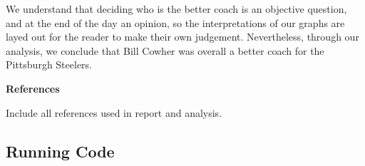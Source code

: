 \documentclass[
  letterpaper,
  DIV=11,
  numbers=noendperiod]{scrartcl}
\begin{document}
We understand that deciding who is the better coach is an objective
question, and at the end of the day an opinion, so the interpretations
of our graphs are layed out for the reader to make their own judgement.
Nevertheless, through our analysis, we conclude that Bill Cowher was
overall a better coach for the Pittsburgh Steelers.

\textbf{References}

Include all references used in report and analysis.

\subsection{Running Code}\label{running-code}
\end{document}
